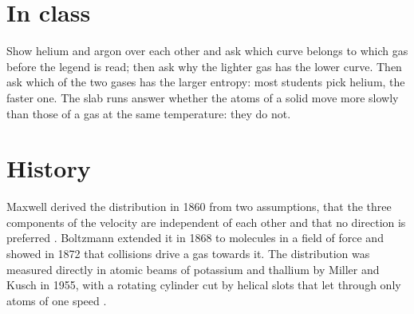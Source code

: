 \section{In class}
Show helium and argon over each other and ask which curve belongs to which gas before the legend is read; then ask why the lighter gas has the lower curve. Then ask which of the two gases has the larger entropy: most students pick helium, the faster one. The slab runs answer whether the atoms of a solid move more slowly than those of a gas at the same temperature: they do not.

\section{History}
Maxwell derived the distribution in 1860 from two assumptions, that the three components of the velocity are independent of each other and that no direction is preferred \cite{maxwell1860}. Boltzmann extended it in 1868 to molecules in a field of force and showed in 1872 that collisions drive a gas towards it. The distribution was measured directly in atomic beams of potassium and thallium by Miller and Kusch in 1955, with a rotating cylinder cut by helical slots that let through only atoms of one speed \cite{miller1955}.
